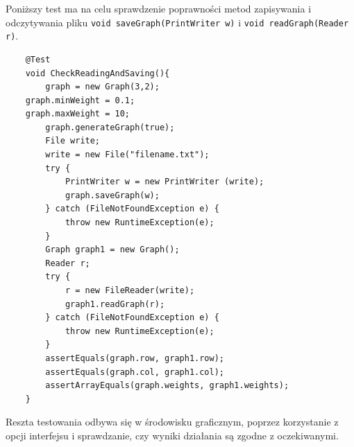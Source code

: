 \documentclass[]{article}
\begin{document}
Poniższy test ma na celu sprawdzenie poprawności metod zapisywania i odczytywania pliku \texttt{void saveGraph(PrintWriter w)} i \texttt{void readGraph(Reader r)}. 
\begin{verbatim}
    @Test
    void CheckReadingAndSaving(){
        graph = new Graph(3,2);
	graph.minWeight = 0.1;
	graph.maxWeight = 10;
        graph.generateGraph(true);
        File write;
        write = new File("filename.txt");
        try {
            PrintWriter w = new PrintWriter (write);
            graph.saveGraph(w);
        } catch (FileNotFoundException e) {
            throw new RuntimeException(e);
        }
        Graph graph1 = new Graph();
        Reader r;
        try {
            r = new FileReader(write);
            graph1.readGraph(r);
        } catch (FileNotFoundException e) {
            throw new RuntimeException(e);
        }
        assertEquals(graph.row, graph1.row);
        assertEquals(graph.col, graph1.col);
        assertArrayEquals(graph.weights, graph1.weights);
    }
\end{verbatim}
Reszta testowania odbywa się w środowisku graficznym, poprzez korzystanie z opcji interfejsu i sprawdzanie, czy wyniki działania są zgodne z oczekiwanymi.
\end{document}
